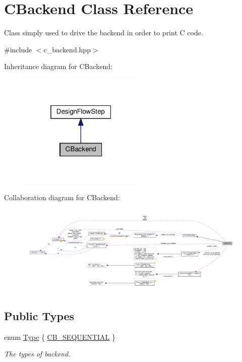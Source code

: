 \hypertarget{classCBackend}{}\section{C\+Backend Class Reference}
\label{classCBackend}


Class simply used to drive the backend in order to print C code.  




{\ttfamily \#include $<$c\+\_\+backend.\+hpp$>$}



Inheritance diagram for C\+Backend\+:
\nopagebreak
\begin{figure}[H]
\begin{center}
\leavevmode
\includegraphics[width=169pt]{d7/d6e/classCBackend__inherit__graph}
\end{center}
\end{figure}


Collaboration diagram for C\+Backend\+:
\nopagebreak
\begin{figure}[H]
\begin{center}
\leavevmode
\includegraphics[width=350pt]{dd/d20/classCBackend__coll__graph}
\end{center}
\end{figure}
\subsection*{Public Types}
\begin{DoxyCompactItemize}
\item 
enum \hyperlink{classCBackend_abadfd9ef309ba4d12e648fe2e3fff08b}{Type} \{ \hyperlink{classCBackend_abadfd9ef309ba4d12e648fe2e3fff08bac7f88561cc85e7035d39ec9ccd25c413}{C\+B\+\_\+\+S\+E\+Q\+U\+E\+N\+T\+I\+AL}
 \}\begin{DoxyCompactList}\small\item\em The types of backend. \end{DoxyCompactList}
\end{DoxyCompactItemize}
